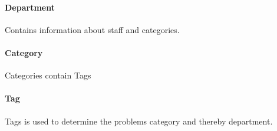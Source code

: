 \paragraph{Department}
Contains information about staff and categories. 

\paragraph{Category} Categories contain Tags

\paragraph{Tag} Tags is used to determine the problems category and thereby department. 


